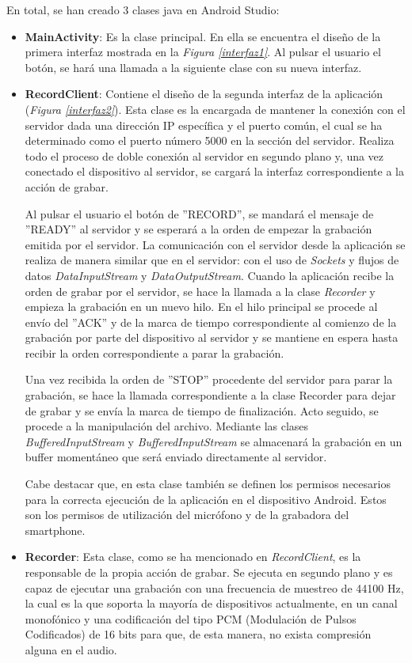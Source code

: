 \documentclass[a4paper,11pt]{book}
\begin{document}
	En total, se han creado 3 clases java en Android Studio:
	\begin{itemize}
	\item \textbf{MainActivity}: Es la clase principal. En ella se encuentra el diseño de la primera interfaz mostrada en la \textit{Figura \ref{interfaz1}}. Al pulsar el usuario el botón, se hará una llamada a la siguiente clase con su nueva interfaz.
	\item \textbf{RecordClient}: Contiene el diseño de la segunda interfaz de la aplicación (\textit{Figura \ref{interfaz2}}). Esta clase es la encargada de mantener la conexión con el servidor dada una dirección IP específica y el puerto común, el cual se ha determinado como el puerto número 5000 en la sección del servidor. Realiza todo el proceso de doble conexión al servidor en segundo plano y, una vez conectado el dispositivo al servidor, se cargará la interfaz correspondiente a la acción de grabar.
	
	Al pulsar el usuario el botón de ''RECORD'', se mandará el mensaje de ''READY'' al servidor y se esperará a la orden de empezar la grabación emitida por el servidor. La comunicación con el servidor desde la aplicación se realiza de manera similar que en el servidor: con el uso de \textit{Sockets} y flujos de datos \textit{DataInputStream} y \textit{DataOutputStream}. Cuando la aplicación recibe la orden de grabar por el servidor, se hace la llamada a la clase \textit{Recorder} y empieza la grabación en un nuevo hilo. En el hilo principal se procede al envío del ''ACK'' y de la marca de tiempo correspondiente al comienzo de la grabación por parte del dispositivo al servidor y se mantiene en espera hasta recibir la orden correspondiente a parar la grabación.
	
	Una vez recibida la orden de ''STOP'' procedente del servidor para parar la grabación, se hace la llamada correspondiente a la clase Recorder para dejar de grabar y se envía la marca de tiempo de finalización. Acto seguido, se procede a la manipulación del archivo. Mediante las clases \textit{BufferedInputStream} y \textit{BufferedInputStream} se almacenará la grabación en un buffer momentáneo que será enviado directamente al servidor.
	
	Cabe destacar que, en esta clase también se definen los permisos necesarios para la correcta ejecución de la aplicación en el dispositivo Android. Estos son los permisos de utilización del micrófono y de la grabadora del smartphone.
	
	\item \textbf{Recorder}: Esta clase, como se ha mencionado en \textit{RecordClient}, es la responsable de la propia acción de grabar. Se ejecuta en segundo plano y es capaz de ejecutar una grabación con una frecuencia de muestreo de 44100 Hz, la cual es la que soporta la mayoría de dispositivos actualmente, en un canal monofónico y una codificación del tipo PCM (Modulación de Pulsos Codificados) de 16 bits para que, de esta manera, no exista compresión alguna en el audio.
	

\end{itemize}
\end{document}

